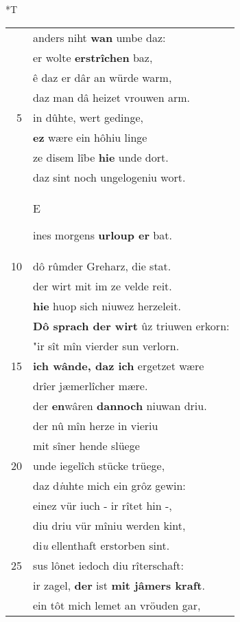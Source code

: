 \documentclass[8pt,a4paper,notitlepage]{article}
\begin{document}
\begin{table}[ht]
\hspace{0.5cm}
\begin{minipage}[t]{0.5\linewidth}
\small
\begin{center}*T
\end{center}
\begin{tabular}{rl}
 & anders niht \textbf{wan} umbe daz:\\ 
 & er wolte \textbf{erstrîchen} baz,\\ 
 & ê daz er dâr an würde warm,\\ 
 & daz man dâ heizet vrouwen arm.\\ 
5 & in dûhte, wert gedinge,\\ 
 & \textbf{ez} wære ein hôhiu linge\\ 
 & ze disem lîbe \textbf{hie} unde dort.\\ 
 & daz sint noch ungelogeniu wort.\\ 
 & \begin{large}E\end{large}ines morgens \textbf{urloup er} bat.\\ 
10 & dô rûmder Greharz, die stat.\\ 
 & der wirt mit im ze velde reit.\\ 
 & \textbf{hie} huop sich niuwez herzeleit.\\ 
 & \textbf{Dô sprach der wirt} ûz triuwen erkorn:\\ 
 & "ir sît mîn vierder sun verlorn.\\ 
15 & \textbf{ich wânde, daz ich} ergetzet wære\\ 
 & drîer jæmerlîcher mære.\\ 
 & der \textbf{en}wâren \textbf{dannoch} niuwan driu.\\ 
 & der nû mîn herze in vieriu\\ 
 & mit sîner hende slüege\\ 
20 & unde iegelîch stücke trüege,\\ 
 & daz d\textit{i}uhte mich ein grôz gewin:\\ 
 & einez vür iuch - ir rîtet hin -,\\ 
 & diu driu vür mîniu werden kint,\\ 
 & di\textit{u} ellenthaft erstorben sint.\\ 
25 & sus lônet iedoch diu rîterschaft:\\ 
 & ir zagel, \textbf{der} ist \textbf{mit jâmers kraft}.\\ 
 & ein tôt mich lemet an vröuden gar,\\ 

\end{tabular}
\end{minipage}
\end{table}
\end{document}
